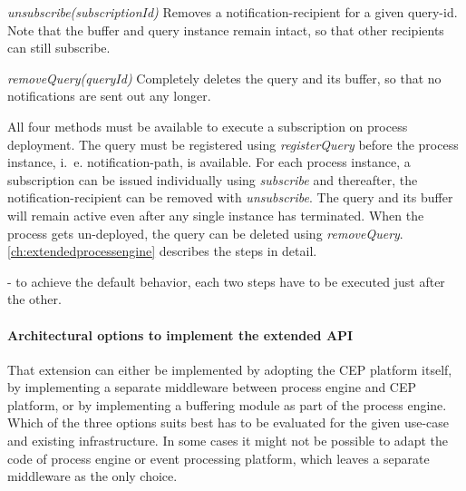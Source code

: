 \begin{aenumerate}
	\setcounter{enumi}{2}
	\item \textit{unsubscribe(subscriptionId)}\newline
	Removes a notification-recipient for a given query-id. Note that the buffer and query instance remain intact, so that other recipients can still subscribe.
	\item \textit{removeQuery(queryId)}\newline
	Completely deletes the query and its buffer, so that no notifications are sent out any longer. 
\end{aenumerate}\label{def:apiextension-unsubscribe}

\noindent
All four methods must be available to execute a subscription on process deployment.
The query must be registered using \textit{registerQuery} before the process instance, i.~e. notification-path, is available. For each process instance, a subscription can be issued individually using \textit{subscribe} and thereafter, the notification-recipient can be removed with \textit{unsubscribe}.
The query and its buffer will remain active even after any single instance has terminated. When the process gets un-deployed, the query can be deleted using \textit{removeQuery}.
\autoref{ch:extendedprocessengine} describes the steps in detail.

- to achieve the default behavior, each two steps have to be executed just after the other.




\paragraph{Architectural options to implement the extended API}

That extension can either be implemented by adopting the CEP platform itself, by implementing a separate middleware between process engine and CEP platform, or by implementing a buffering module as part of the process engine.
Which of the three options suits best has to be evaluated for the given use-case and existing infrastructure. In some cases it might not be possible to adapt the code of process engine or event processing platform, which leaves a separate middleware as the only choice.

